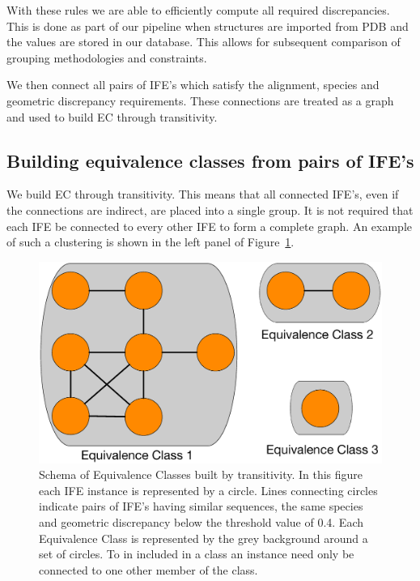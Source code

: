 With these rules we are able to efficiently compute all required discrepancies.
This is done as part of our pipeline when structures are imported from PDB and
the values are stored in our database. This allows for subsequent comparison of
grouping methodologies and constraints.

We then connect all pairs of IFE's which satisfy the alignment, species and
geometric discrepancy requirements. These connections are treated as a graph and
used to build EC through transitivity.

\subsection{Building equivalence classes from pairs of IFE's}

We build EC through transitivity. This means that all connected IFE's, even if
the connections are indirect, are placed into a single group. It is not required
that each IFE be connected to every other IFE to form a complete graph. An
example of such a clustering is shown in the left panel of
Figure~\ref{fig:transitivity}.

\begin{figure}[ht]
  \includegraphics[width=\linewidth]{chapter-3/figs/ife-transtivity}
  \caption{Schema of Equivalence Classes built by transitivity. In this figure
    each IFE instance is represented by a circle. Lines connecting circles
    indicate pairs of IFE's having similar sequences, the same species and
    geometric discrepancy below the threshold value of 0.4. Each Equivalence
  Class is represented by the grey background around a set of circles. To in
included in a class an instance need only be connected to one other member of
the class.}
  \label{fig:transitivity}
\end{figure}


